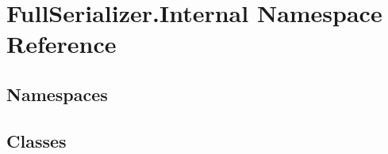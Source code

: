 \hypertarget{namespace_full_serializer_1_1_internal}{}\section{Full\+Serializer.\+Internal Namespace Reference}
\label{namespace_full_serializer_1_1_internal}
\subsection*{Namespaces}
\begin{DoxyCompactItemize}
\end{DoxyCompactItemize}
\subsection*{Classes}
